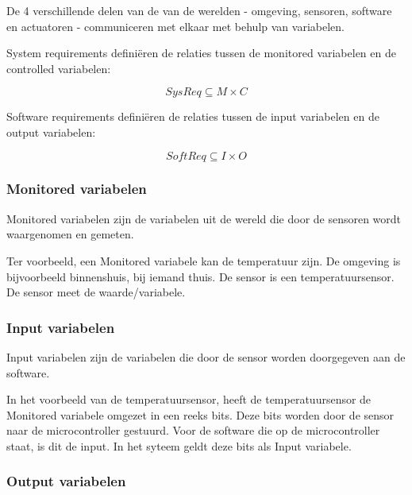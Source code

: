 \documentclass{article}
\begin{document}
		De 4 verschillende delen van de van de werelden - omgeving, sensoren, software en actuatoren - communiceren met elkaar met behulp van variabelen. \par
	
		System requirements definiëren de relaties tussen de monitored variabelen en de controlled variabelen:

		\[ SysReq \subseteq M \times C\]

		Software requirements definiëren de relaties tussen de input variabelen en de output variabelen:

		\[ SoftReq \subseteq I \times O \]
		
			\subsubsection{Monitored variabelen}
			
			Monitored variabelen zijn de variabelen uit de wereld die door de sensoren wordt waargenomen en gemeten. \par
			
			Ter voorbeeld, een Monitored variabele kan de temperatuur zijn. De omgeving is bijvoorbeeld binnenshuis, bij iemand thuis. De sensor is een temperatuursensor. De sensor meet de waarde/variabele. \par
			
			\subsubsection{Input variabelen}
			
			Input variabelen zijn de variabelen die door de sensor worden doorgegeven aan de software. \par

			In het voorbeeld van de temperatuursensor, heeft de temperatuursensor de Monitored variabele omgezet in een reeks bits. Deze bits worden door de sensor naar de microcontroller gestuurd. Voor de software die op de microcontroller staat, is dit de input. In het syteem geldt deze bits als Input variabele. \par
			
			\subsubsection{Output variabelen}
			
\end{document}
